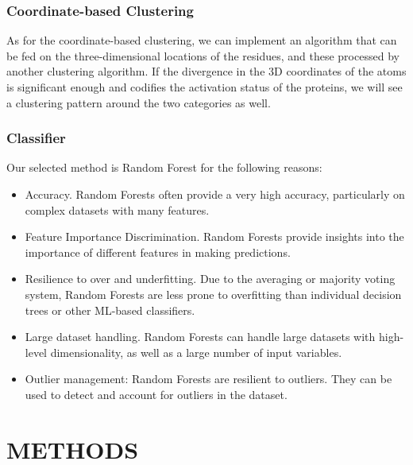 \documentclass{article}
\begin{document}
\subsubsection{Coordinate-based Clustering}

As for the coordinate-based clustering, we can implement an algorithm that can be fed on the three-dimensional locations of the residues, and these processed by another clustering algorithm. If the divergence in the 3D coordinates of the atoms is significant enough and codifies the activation status of the proteins, we will see a clustering pattern around the two categories as well.

\subsubsection{Classifier}

Our selected method is Random Forest for the following reasons:

\begin{itemize}
    \item Accuracy. Random Forests often provide a very high accuracy, particularly on complex datasets with many features.

    \item Feature Importance Discrimination. Random Forests provide insights into the importance of different features in making predictions.

    \item Resilience to over and underfitting. Due to the averaging or majority voting system, Random Forests are less prone to overfitting than individual decision trees or other ML-based classifiers.

    \item Large dataset handling. Random Forests can handle large datasets with high-level dimensionality, as well as a large number of input variables.

    \item Outlier management: Random Forests are resilient to outliers. They can be used to detect and account for outliers in the dataset.
\end{itemize}

\section{METHODS}
\end{document}
